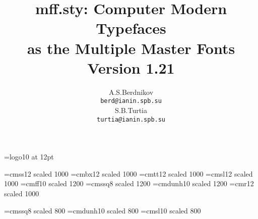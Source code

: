 \title{{\sc mff.sty}: Computer Modern Typefaces\\
as the Multiple Master Fonts\\[0.5\baselineskip]
\Large Version 1.21}

\author{
\begin{minipage}{0.4\textwidth}
\begin{center} A.S.Berdnikov\\{\tt berd{\sl @}ianin.spb.su} \end{center}
\end{minipage}
\hfill
\begin{minipage}{0.4\textwidth}
\begin{center} S.B.Turtia\\{\tt turtia{\sl @}ianin.spb.su} \end{center}
\end{minipage}
}

\date{}

\def\PiC{P\kern-.12em\lower.5ex\hbox{I}\kern-.075emC\spacefactor1000 }
\font\manual=logo10 at 12pt
\def\MF{{\manual META}\-{\manual FONT}\spacefactor1000 }
\def\AW{Addison\kern.1em-\penalty 0pt \hskip 0pt Wesley}
\def\CandT{{\sl Computers \& Typesetting}}
\def\TUB{{\sl TUGboat\/}}

\font\cmcmss=cmss12 scaled 1000
\font\cmcmbx=cmbx12 scaled 1000
\font\cmcmtt=cmtt12 scaled 1000
\font\cmcmsl=cmsl12 scaled 1000
\font\cmfunny=cmff10 scaled 1200
\font\cmquote=cmssq8 scaled 1200
\font\cmdunh=cmdunh10 scaled 1200
\font\cmcmr=cmr12 scaled 1000

\font\cmq=cmssq8 scaled 800
\font\cmd=cmdunh10 scaled 800
\font\csl=cmsl10 scaled 800

\newcommand{\bs}{\char92}   %

\makeatletter
\def\hackersmile{\@ifnextchar[{\@hackersmile}{\@hackersmile[10]}}
\def\@hackersmile[#1]{\hbox{%
   \unitlength=1pt\relax
   \unitlength=#1\unitlength
   \divide\unitlength by 10\relax
   \thicklines
   \raise -3\unitlength \hbox{%
   \begin{picture}(12,12)(-6,-6)
   \put(0,0){\circle{10}}
   \put(-2,1.75){\circle*{1}}
   \put(2,1.75){\circle*{1}}
   \thicklines
   \put(-2.75,3){\line(1,0){1.5}}
   \put(2.75,3){\line(-1,0){1.5}}
   \put(0,-1){\line(0,1){3}}
   \put(-2.5,-2.5){\line(1,0){5}}
   \put(-2.5,-2.5){\line(0,1){1}}
   \put(2.5,-2.5){\line(0,1){1}}
   \end{picture}%
}}}
\makeatother



